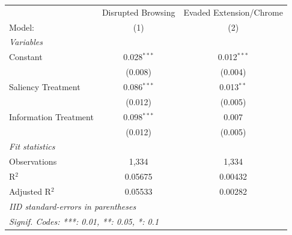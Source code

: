 
\begingroup
\centering
\begin{tabular}{lcc}
   \tabularnewline \midrule \midrule
                         & Disrupted Browsing & Evaded Extension/Chrome \\   
   Model:                & (1)                & (2)\\  
   \midrule
   \emph{Variables}\\
   Constant              & 0.028$^{***}$      & 0.012$^{***}$\\   
                         & (0.008)            & (0.004)\\   
   Saliency Treatment    & 0.086$^{***}$      & 0.013$^{**}$\\   
                         & (0.012)            & (0.005)\\   
   Information Treatment & 0.098$^{***}$      & 0.007\\   
                         & (0.012)            & (0.005)\\   
   \midrule
   \emph{Fit statistics}\\
   Observations          & 1,334              & 1,334\\  
   R$^2$                 & 0.05675            & 0.00432\\  
   Adjusted R$^2$        & 0.05533            & 0.00282\\  
   \midrule \midrule
   \multicolumn{3}{l}{\emph{IID standard-errors in parentheses}}\\
   \multicolumn{3}{l}{\emph{Signif. Codes: ***: 0.01, **: 0.05, *: 0.1}}\\
\end{tabular}
\par\endgroup


